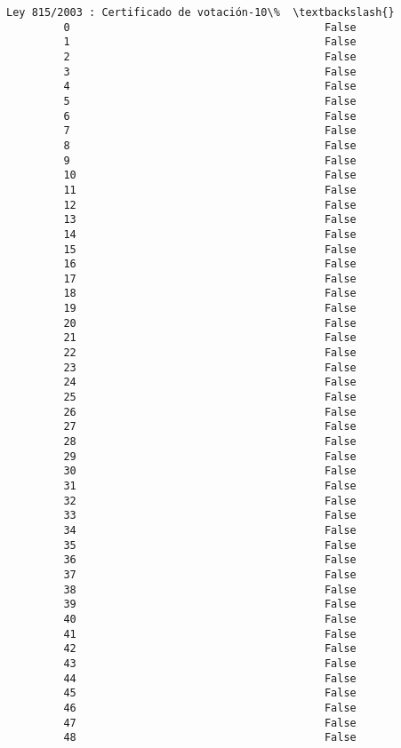 \documentclass[11pt]{article}
\begin{document}
\begin{Verbatim}[commandchars=\\\{\}]
             Ley 815/2003 : Certificado de votación-10\%  \textbackslash{}
         0                                        False   
         1                                        False   
         2                                        False   
         3                                        False   
         4                                        False   
         5                                        False   
         6                                        False   
         7                                        False   
         8                                        False   
         9                                        False   
         10                                       False   
         11                                       False   
         12                                       False   
         13                                       False   
         14                                       False   
         15                                       False   
         16                                       False   
         17                                       False   
         18                                       False   
         19                                       False   
         20                                       False   
         21                                       False   
         22                                       False   
         23                                       False   
         24                                       False   
         25                                       False   
         26                                       False   
         27                                       False   
         28                                       False   
         29                                       False   
         30                                       False   
         31                                       False   
         32                                       False   
         33                                       False   
         34                                       False   
         35                                       False   
         36                                       False   
         37                                       False   
         38                                       False   
         39                                       False   
         40                                       False   
         41                                       False   
         42                                       False   
         43                                       False   
         44                                       False   
         45                                       False   
         46                                       False   
         47                                       False   
         48                                       False   
         

\end{Verbatim}
\end{document}

